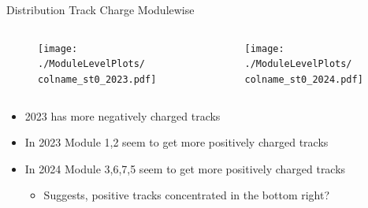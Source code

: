 \begin{frame}{Distribution Track Charge Modulewise}
    \newcommand{\colname}{Track_charge}
    \begin{columns}
        \begin{column}{0.6\linewidth}
            \begin{figure}
                \centering
                \texttt{[image: ./ModuleLevelPlots/\\colname\_st0\_2023.pdf]}
            \end{figure}
        \end{column}
        \begin{column}{0.6\linewidth}
            \begin{figure}
                \centering
                \texttt{[image: ./ModuleLevelPlots/\\colname\_st0\_2024.pdf]}
            \end{figure}
        \end{column}
    \end{columns}

    \begin{itemize}
        \small
        \item 2023 has more negatively charged tracks
        \item In 2023 Module 1,2 seem to get more positively charged tracks
        \item In 2024 Module 3,6,7,5 seem to get more positively charged tracks
        \begin{itemize}
            \item Suggests, positive tracks concentrated in the bottom right?
        \end{itemize}
    \end{itemize}
\end{frame}

